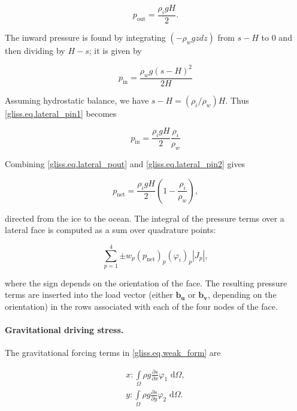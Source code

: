 {\begin{equation}
  \label{gliss.eq.lateral_pout}
  p_{\text{out}} = \frac{\rho_i g H}{2}.
\end{equation}

\noindent
The inward pressure is found by integrating $(-\rho_w g z dz)$ from $s-H$ to 0
and then dividing by $H-s$; it is given by

\begin{equation}
  \label{gliss.eq.lateral_pin1}
  p_{\text{in}} = \frac{\rho_w g (s-H)^2}{2H}
\end{equation}

\noindent
Assuming hydrostatic balance, we have $s-H = (\rho_i/\rho_w)H$. Thus \eqref{gliss.eq.lateral_pin1} becomes

\begin{equation}
  \label{gliss.eq.lateral_pin2}
  p_{\text{in}} = \frac{\rho_i g H}{2} \frac{\rho_i}{\rho_w}
\end{equation}

\noindent
Combining \eqref{gliss.eq.lateral_pout} and \eqref{gliss.eq.lateral_pin2} gives

\begin{equation}
  \label{gliss.eq.lateral_pnet}
  p_{\text{net}} = \frac{\rho_i g H}{2} \left(1 - \frac{\rho_i}{\rho_w}\right),
\end{equation}

\noindent
directed from the ice to the ocean.  
The integral of the pressure terms over a lateral face is computed as a sum over quadrature points:

\begin{equation}
  \label{gliss.eq.sum_over_qp_lateral}
  \sum\limits_{p=1}^{4} {\pm w_p (p_\text{net})_p (\varphi_i)_p |J_p|},
\end{equation}

\noindent
where the sign depends on the orientation of the face.  The resulting pressure terms
are inserted into the load vector (either $\mathbf{b_u}$ or $\mathbf{b_v}$, depending on the orientation)
in the rows associated with each of the four nodes of the face.

\paragraph{Gravitational driving stress.}

The gravitational forcing terms in \eqref{gliss.eq.weak_form} are

\begin{equation}
  \label{gliss.eq.gravity_forcing}
  \begin{split}
    x: \int\limits_{\Omega } {\rho g\frac{\partial s}{\partial x}} {{\varphi }_{1}}\text{ d}\Omega, \\
    y: \int\limits_{\Omega } {\rho g\frac{\partial s}{\partial y}} {{\varphi }_{2}}\text{ d}\Omega. \\
  \end{split}
\end{equation}

}
